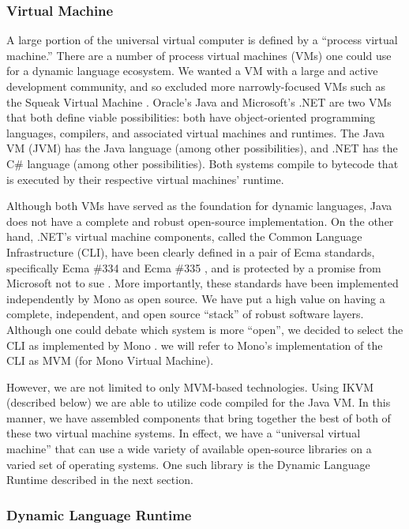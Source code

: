\documentclass[preprint]{sigplanconf}
\begin{document}
\subsubsection{Virtual Machine}

A large portion of the universal virtual computer is defined by a
``process virtual machine.'' There are a number of process virtual
machines (VMs) one could use for a dynamic language ecosystem. We
wanted a VM with a large and active development community, and so
excluded more narrowly-focused VMs such as the Squeak Virtual Machine
\cite{squeakvm}. Oracle's Java and Microsoft's .NET are two VMs that
both define viable possibilities: both have object-oriented
programming languages, compilers, and associated virtual machines and
runtimes. The Java VM (JVM) has the Java language (among other
possibilities), and .NET has the C\# language (among other
possibilities). Both systems compile to bytecode that is executed by
their respective virtual machines' runtime.

Although both VMs have served as the foundation for dynamic languages,
Java does not have a complete and robust open-source
implementation. On the other hand, .NET’s virtual machine components,
called the Common Language Infrastructure (CLI), have been clearly
defined in a pair of Ecma standards, specifically Ecma \#334 and Ecma
\#335 \cite{ecma-standards}, and is protected by a promise from
Microsoft not to sue \cite{microsoft-community-promise}. More
importantly, these standards have been implemented independently by
Mono as open source. We have put a high value on having a complete,
independent, and open source ``stack'' of robust software
layers. Although one could debate which system is more ``open'', we
decided to select the CLI as implemented by Mono \cite{mono}. we will
refer to Mono's implementation of the CLI as MVM (for Mono Virtual
Machine).

However, we are not limited to only MVM-based technologies. Using IKVM
(described below) we are able to utilize code compiled for the Java
VM. In this manner, we have assembled components that bring together
the best of both of these two virtual machine systems. In effect, we
have a ``universal virtual machine'' that can use a wide variety of
available open-source libraries on a varied set of operating
systems. One such library is the Dynamic Language Runtime described in
the next section.

\subsubsection{Dynamic Language Runtime}
\end{document}
